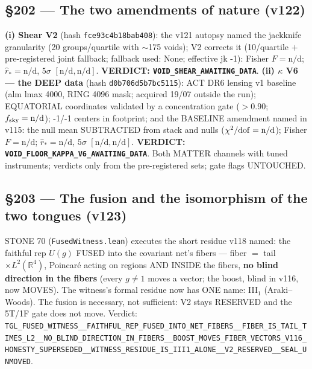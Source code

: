 \documentclass[11pt]{article}
\theoremstyle{definition}\newtheorem{deriv}{Derivation}
\begin{document}
\subsection*{\S202 --- The two amendments of nature (v122)}\textbf{(i) Shear V2} (hash \texttt{fce93c4b18bab408}): the v121 autopsy named the jackknife granularity (20 groups/quartile with $\sim$175 voids); V2 corrects it (10/quartile $+$ pre-registered joint fallback; fallback used: None; effective jk -1): Fisher $F=\text{n/d}$; $\hat r_*=\text{n/d}$, $5\sigma$ $[\text{n/d},\text{n/d}]$. \textbf{VERDICT: \texttt{VOID\_SHEAR\_AWAITING\_DATA}}. \textbf{(ii) $\kappa$ V6 --- the DEEP data} (hash \texttt{d0b706d5b7bc5115}): ACT DR6 lensing v1 baseline (alm lmax 4000, RING 4096 mask; acquired 19/07 outside the run); EQUATORIAL coordinates validated by a concentration gate ($>$0.90; $f_{\rm sky}=\text{n/d}$); -1/-1 centers in footprint; and the BASELINE amendment named in v115: the null mean SUBTRACTED from stack and nulls ($\chi^2/{\rm dof}=\text{n/d}$); Fisher $F=\text{n/d}$; $\hat r_*=\text{n/d}$, $5\sigma$ $[\text{n/d},\text{n/d}]$. \textbf{VERDICT: \texttt{VOID\_FLOOR\_KAPPA\_V6\_AWAITING\_DATA}}. Both MATTER channels with tuned instruments; verdicts only from the pre-registered sets; gate flags UNTOUCHED.

\subsection*{\S203 --- The fusion and the isomorphism of the two tongues (v123)}STONE 70 (\texttt{FusedWitness.lean}) executes the short residue v118 named: the faithful rep $U(g)$ FUSED into the covariant net's fibers --- fiber $=$ tail $\times L^2(\mathbb{R}^4)$, Poincaré acting on regions AND INSIDE the fibers, \textbf{no blind direction in the fibers} (every $g\neq1$ moves a vector; the boost, blind in v116, now MOVES). The witness's formal residue now has ONE name: III$_1$ (Araki--Woods). The fusion is necessary, not sufficient: V2 stays RESERVED and the 5T/1F gate does not move. Verdict: \texttt{TGL\_FUSED\_WITNESS\_\_FAITHFUL\_REP\_FUSED\_INTO\_NET\_FIBERS\_\_FIBER\_IS\_TAIL\_TIMES\_L2\_\_NO\_BLIND\_DIRECTION\_IN\_FIBERS\_\_BOOST\_MOVES\_FIBER\_VECTORS\_V116\_HONESTY\_SUPERSEDED\_\_WITNESS\_RESIDUE\_IS\_III1\_ALONE\_\_V2\_RESERVED\_\_SEAL\_UNMOVED}.
\end{document}
